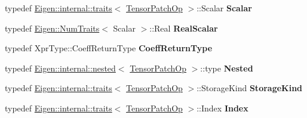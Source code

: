 \begin{DoxyCompactItemize}
typedef \hyperlink{struct_eigen_1_1internal_1_1traits}{Eigen\+::internal\+::traits}$<$ \hyperlink{class_eigen_1_1_tensor_patch_op}{Tensor\+Patch\+Op} $>$\+::Scalar {\bfseries Scalar}
\item 
\mbox{\label{class_eigen_1_1_tensor_patch_op_a6832903a926f4fd8aece0b6714dc32fb}} 
typedef \hyperlink{group___core___module_struct_eigen_1_1_num_traits}{Eigen\+::\+Num\+Traits}$<$ Scalar $>$\+::Real {\bfseries Real\+Scalar}
\item 
\mbox{\label{class_eigen_1_1_tensor_patch_op_a8de8e6f06026f5017f2af3c0c499d806}} 
typedef Xpr\+Type\+::\+Coeff\+Return\+Type {\bfseries Coeff\+Return\+Type}
\item 
\mbox{\label{class_eigen_1_1_tensor_patch_op_a94c5b255acaf48de2f533846461da7f1}} 
typedef \hyperlink{struct_eigen_1_1internal_1_1nested}{Eigen\+::internal\+::nested}$<$ \hyperlink{class_eigen_1_1_tensor_patch_op}{Tensor\+Patch\+Op} $>$\+::type {\bfseries Nested}
\item 
\mbox{\label{class_eigen_1_1_tensor_patch_op_a1fcdc10e6bb1228a0d084f4d302c5df1}} 
typedef \hyperlink{struct_eigen_1_1internal_1_1traits}{Eigen\+::internal\+::traits}$<$ \hyperlink{class_eigen_1_1_tensor_patch_op}{Tensor\+Patch\+Op} $>$\+::Storage\+Kind {\bfseries Storage\+Kind}
\item 
\mbox{\label{class_eigen_1_1_tensor_patch_op_a39afbf0a24b9c6be84b53c5a36dc03fd}} 
typedef \hyperlink{struct_eigen_1_1internal_1_1traits}{Eigen\+::internal\+::traits}$<$ \hyperlink{class_eigen_1_1_tensor_patch_op}{Tensor\+Patch\+Op} $>$\+::Index {\bfseries Index}
\end{DoxyCompactItemize}

